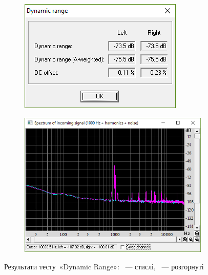 \documentclass[
	a4paper,
	oneside,
	BCOR = 10mm,
	DIV = 12,
	12pt,
	headings = normal,
]{scrartcl}
\begin{document}
			\begin{figure}[!htbp]
				\centering
				\begin{subfigure}[t]{\columnwidth / 2}
					\centering
					\includegraphics[height=08\baselineskip]{./assets/y03s02-pcdiag-lab-07-p04-01-dynrange.png}
					\caption{}
					\label{subfig:sca-dynrange}
				\end{subfigure}%
				\begin{subfigure}[t]{\columnwidth / 2}
					\centering
					\includegraphics[height=08\baselineskip]{./assets/y03s02-pcdiag-lab-07-p04-02-dynrange-det.png}
					\caption{}
					\label{subfig:sca-dynrange-det}
				\end{subfigure}
				\caption{Результати тесту~«\textenglish{Dynamic Range}»: ~— стислі, ~— розгорнуті}
				\label{fig:sca-dynrange}
			\end{figure}
	
\end{document}
